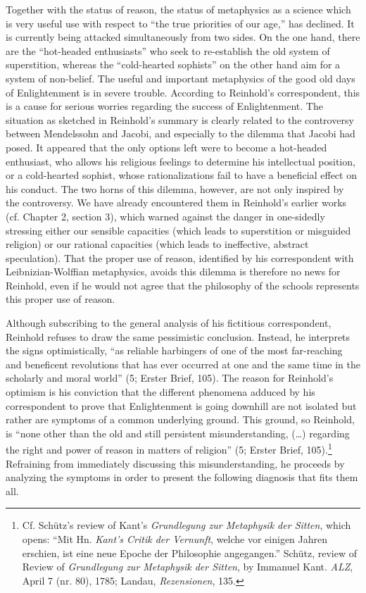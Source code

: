 Together with the status of reason, the status of metaphysics as a science which is very useful use with respect to ``the true priorities of our age,'' has declined. It is currently being attacked simultaneously from two sides. On the one hand, there are the ``hot{-}headed enthusiasts'' who seek to re{-}establish the old system of superstition, whereas the ``cold{-}hearted sophists'' on the other hand aim for a system of non{-}belief. The useful and important metaphysics of the good old days of Enlightenment is in severe trouble. According to Reinhold's correspondent, this is a cause for serious worries regarding the success of Enlightenment. The situation as sketched in Reinhold's summary is clearly related to the controversy between Mendelssohn and Jacobi, and especially to the dilemma that Jacobi had posed. It appeared that the only options left were to become a hot{-}headed enthusiast, who allows his religious feelings to determine his intellectual position, or a cold{-}hearted sophist, whose rationalizations fail to have a beneficial effect on his conduct. The two horns of this dilemma, however, are not only inspired by the controversy. We have already encountered them in Reinhold's earlier works (cf. Chapter 2, section 3), which warned against the danger in one{-}sidedly stressing either our sensible capacities (which leads to superstition or misguided religion) or our rational capacities (which leads to ineffective, abstract speculation). That the proper use of reason, identified by his correspondent with Leibnizian{-}Wolffian metaphysics, avoids this dilemma is therefore no news for Reinhold, even if he would not agree that the philosophy of the schools represents this proper use of reason. 

 Although subscribing to the general analysis of his fictitious correspondent, Reinhold refuses to draw the same pessimistic conclusion. Instead, he interprets the signs optimistically, ``as reliable harbingers of one of the most far{-}reaching and beneficent revolutions that has ever occurred at one and the same time in the scholarly and moral world'' (5; Erster Brief, 105). The reason for Reinhold's optimism is his conviction that the different phenomena adduced by his correspondent to prove that Enlightenment is going downhill are not isolated but rather are symptoms of a common underlying ground. This ground, so Reinhold, is ``none other than the old and still persistent misunderstanding, (\ldots ) regarding the right and power of reason in matters of religion'' (5; Erster Brief, 105).\footnote{ Cf. Sch\"{u}tz's review of Kant's \textit{Grundlegung zur Metaphysik der Sitten}, which opens: ``Mit Hn. \textit{Kant's Critik der Vernunft}, welche vor einigen Jahren erschien, ist eine neue Epoche der Philosophie angegangen.'' Sch\"{u}tz, review of Review of \textit{Grundlegung zur Metaphysik der Sitten}, by Immanuel Kant. \textit{ALZ}, April 7 (nr. 80), 1785; Landau, \textit{Rezensionen}, 135. } Refraining from immediately discussing this misunderstanding, he proceeds by analyzing the symptoms in order to present the following diagnosis that fits them all. 

